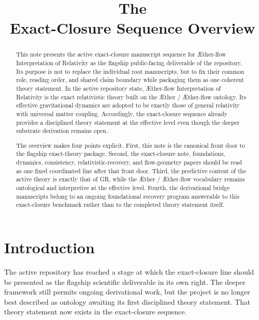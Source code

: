 \documentclass[11pt]{article}
\title{\textbf{The \TheoryName{}}\\[0.4em]
\large Exact-Closure Sequence Overview}
\author{}
\date{}
\newcommand{\Aether}{\AE{}ther}
\newcommand{\Aflow}{\AE{}ther-flow}
\newcommand{\TheoryName}{\Aflow{} Interpretation of Relativity}
\begin{document}
\maketitle

\begin{abstract}
This note presents the active exact-closure manuscript sequence for \TheoryName{} as the flagship public-facing deliverable of the repository. Its purpose is not to replace the individual root manuscripts, but to fix their common role, reading order, and shared claim boundary while packaging them as one coherent theory statement. In the active repository state, \TheoryName{} is the exact relativistic theory built on the \Aether{} / \Aflow{} ontology. Its effective gravitational dynamics are adopted to be exactly those of general relativity with universal matter coupling. Accordingly, the exact-closure sequence already provides a disciplined theory statement at the effective level even though the deeper substrate derivation remains open.

The overview makes four points explicit. First, this note is the canonical front door to the flagship exact-theory package. Second, the exact-closure note, foundations, dynamics, consistency, relativistic-recovery, and flow-geometry papers should be read as one fixed coordinated line after that front door. Third, the predictive content of the active theory is exactly that of GR, while the \Aether{} / \Aflow{} vocabulary remains ontological and interpretive at the effective level. Fourth, the derivational bridge manuscripts belong to an ongoing foundational recovery program answerable to this exact-closure benchmark rather than to the completed theory statement itself.
\end{abstract}

\section{Introduction}

The active repository has reached a stage at which the exact-closure line should be presented as the flagship scientific deliverable in its own right. The deeper framework still permits ongoing derivational work, but the project is no longer best described as ontology awaiting its first disciplined theory statement. That theory statement now exists in the exact-closure sequence.
\end{document}
